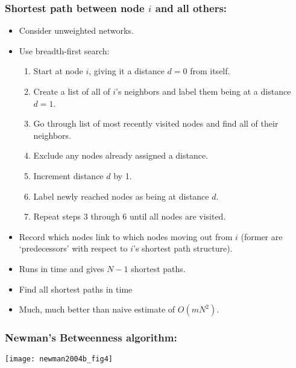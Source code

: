 \begin{frame}
  \frametitle{Shortest path between node $i$ and all others:}  

    \begin{itemize}
    \item<2-> 
      Consider unweighted networks.
    \item<3-> 
      Use \alert{breadth-first search:}
    \begin{enumerate}
      \item<4-> 
        Start at node $i$, giving it a distance $d=0$ from itself.
      \item<5->
        Create a list of all of $i$'s neighbors and label them
        being at a distance $d=1$.
      \item<6->
        Go through list of most recently visited nodes
        and find all of their neighbors.
      \item<7->
        Exclude any nodes already assigned a distance.
      \item<8->
        Increment distance $d$ by 1.
      \item<9->
        Label newly reached nodes as being at distance $d$.
      \item<10->
        Repeat steps 3 through 6 until all nodes are visited.
      \end{enumerate}
    \item<11->
      Record which nodes link to which nodes moving
      out from $i$ (former are `predecessors' with respect
      to $i$'s shortest path structure).
    \item<12->
      Runs in  time and gives $N-1$ shortest paths.
    \item<13->
      Find all shortest paths in  time\\
    \item<14->
      Much, much better than naive estimate of $O (mN^2)$.
    \end{itemize}
  
\end{frame}

\begin{frame}
  \frametitle{Newman's Betweenness algorithm:\cite{newman2001d}}

  \texttt{[image: newman2004b\_fig4]}
  
\end{frame}

